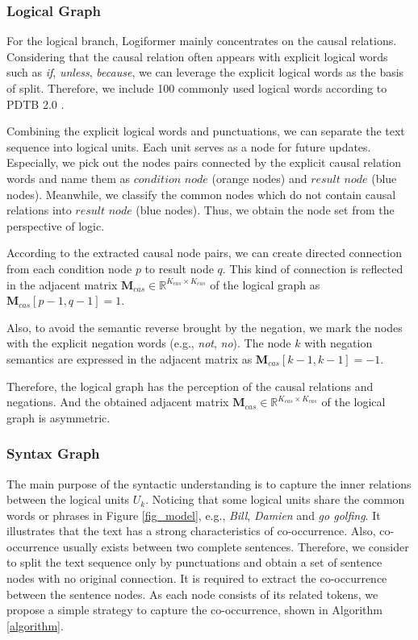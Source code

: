\documentclass[sigconf]{acmart}
\begin{document}
\subsubsection{\textbf{Logical Graph}}
For the logical branch, Logiformer mainly concentrates on the causal relations. 
Considering that the causal relation often appears with explicit logical words 
such as \textit{if}, \textit{unless}, \textit{because}, we can leverage the 
explicit logical words as the basis of split. Therefore, we include 100 
commonly used logical words according to PDTB 2.0 \cite{prasad2008penn}.

Combining the explicit logical words and punctuations, we can separate the text 
sequence into logical units. Each unit serves as a node for future updates. 
Especially, we pick out the nodes pairs connected by the explicit causal 
relation words and name them as $condition$ $node$ (orange nodes) and $result$ 
$node$ (blue nodes). Meanwhile, we classify the common nodes which do not 
contain causal relations into $result$ $node$ (blue nodes). Thus, we obtain the 
node set from the perspective of logic.

According to the extracted causal node pairs, we can create directed connection 
from each condition node $p$ to result node $q$. This kind of connection is 
reflected in the adjacent matrix $\mathbf{M}_{cas} \in 
\mathbb{R}^{K_{cas}\times K_{cas}}$ of the logical graph as 
$\mathbf{M}_{cas}[p-1, q-1] = 1$.

Also, to avoid the semantic reverse brought by the negation, we mark the nodes with the explicit negation words (e.g., \textit{not}, \textit{no}). The node $k$ with negation semantics are expressed in the adjacent matrix as $\mathbf{M}_{cas}[k-1, k-1] = -1$.

Therefore, the logical graph has the perception of the causal relations and 
negations. And the obtained adjacent matrix $\mathbf{M}_{cas} \in 
\mathbb{R}^{K_{cas}\times K_{cas}}$ of the logical graph is asymmetric. 

\vspace{-0.25cm}
\subsubsection{\textbf{Syntax Graph}}
The main purpose of the syntactic understanding is to capture the inner relations between the logical units $U_{k}$. Noticing that some logical units share the common words or phrases in Figure \ref{fig_model}, e.g., \textit{Bill}, \textit{Damien} and \textit{go golfing}. It illustrates that the text has a strong characteristics of co-occurrence. Also, co-occurrence usually exists between two complete sentences. Therefore, we consider to split the text sequence only by punctuations and obtain a set of sentence nodes with no original connection. It is required to extract the co-occurrence between the sentence nodes. As each node consists of its related tokens, we propose a simple strategy to capture the co-occurrence, shown in Algorithm \ref{algorithm}.
\end{document}
